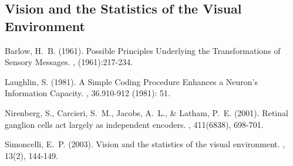 \documentclass[twoside]{article}
\begin{document}
\begin{multicols}{2}




\section{Vision and the Statistics of the Visual Environment}









\begin{thebibliography}{99} 

Barlow, H.~B. (1961).
\newblock Possible Principles Underlying the Transformations of Sensory Messages.
, (1961):217-234.

Laughlin, S. (1981).
\newblock A Simple Coding Procedure Enhances a Neuron's Information Capacity.
, 36.910-912 (1981): 51.

Nirenberg, S., Carcieri, S.~M., Jacobs, A.~L., \& Latham, P.~E. (2001).
\newblock Retinal ganglion cells act largely as independent encoders.
, 411(6838), 698-701.

Simoncelli, E.~P. (2003).
\newblock  Vision and the statistics of the visual environment.
, 13(2), 144-149.
 
\end{thebibliography}



\end{multicols}
\end{document}
